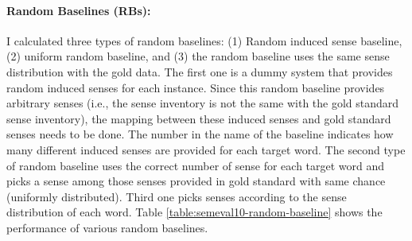 \paragraph{Random Baselines (RBs):}I calculated three types of random baselines: (1) Random induced sense baseline, (2) uniform random baseline, and (3) the random baseline uses the same sense distribution with the gold data. The first one is a dummy system that provides random induced senses for each instance. Since this random baseline provides arbitrary senses (i.e., the sense inventory is not the same with the gold standard sense inventory), the mapping between these induced senses and gold standard senses needs to be done. The number in the name of the baseline indicates how many different induced senses are provided for each target word. The second type of random baseline uses the correct number of sense for each target word and picks a sense among those senses provided in gold standard with same chance (uniformly distributed). Third one picks senses according to the sense distribution of each word. Table \ref{table:semeval10-random-baseline} shows the performance of various random baselines. 



